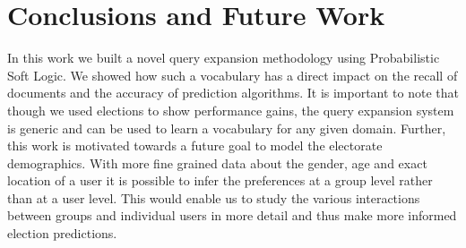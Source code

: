 \chapter{Conclusions and Future Work}
In this work we built a novel query expansion methodology using Probabilistic Soft Logic.
We showed how such a vocabulary has a direct impact on the recall of documents and the accuracy of prediction algorithms.
It is important to note that though we used elections to show performance gains, the query expansion system is generic and can be used to learn a vocabulary for any given domain.
Further, this work is motivated towards a future goal to model the electorate demographics.
With more fine grained data about the gender, age and exact location of a user it is possible to infer the preferences at a group level rather than at a user level.
This would enable us to study the various interactions between groups and individual users in more detail and thus make more informed election predictions.
